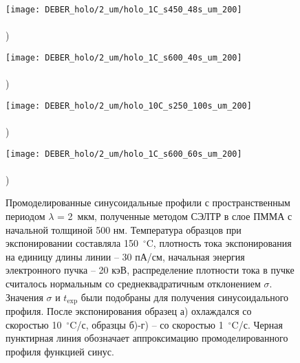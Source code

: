 \begin{figure}[h!]
	\begin{minipage}{0.48\textwidth}
		\texttt{[image: DEBER\_holo/2\_um/holo\_1C\_s450\_48s\_um\_200]} \\
		\vspace{-12em} \\ ) \\ \vspace{12em}
	\end{minipage}
	\begin{minipage}{0.48\textwidth}
		\texttt{[image: DEBER\_holo/2\_um/holo\_1C\_s600\_40s\_um\_200]} \\
		\vspace{-12em} \\ ) \\ \vspace{12em}
	\end{minipage}
	
	\vspace{-3.5em}
	
	\begin{minipage}{0.48\textwidth}
		\texttt{[image: DEBER\_holo/2\_um/holo\_10C\_s250\_100s\_um\_200]} \\
		\vspace{-12em} \\ ) \\ \vspace{12em}
	\end{minipage}
	\begin{minipage}{0.48\textwidth}
		\texttt{[image: DEBER\_holo/2\_um/holo\_1C\_s600\_60s\_um\_200]} \\
		\vspace{-12em} \\ ) \\ \vspace{12em}
	\end{minipage}
	\vspace{-3.5em}
	\caption{Промоделированные синусоидальные профили с пространственным периодом $\lambda$ = 2~мкм, полученные методом СЭЛТР в слое ПММА с начальной толщиной 500 нм. Температура образцов при экспонировании составляла 150~$^\circ$C, плотность тока экспонирования на единицу длины линии -- 30 пА/см, начальная энергия электронного пучка -- 20 кэВ, распределение плотности тока в пучке считалось нормальным со среднеквадратичным отклонением $\sigma$. Значения $\sigma$ и $t_\mathrm{exp}$ были подобраны для получения синусоидального профиля. После экспонирования образец а) охлаждался со скоростью 10~$^\circ$C/с, образцы б)-г) -- со скоростью 1~$^\circ$C/с. Черная пунктирная линия обозначает аппроксимацию промоделированного профиля функцией синус.}
	\label{fig:DEBER_holo_2um}
\end{figure}

